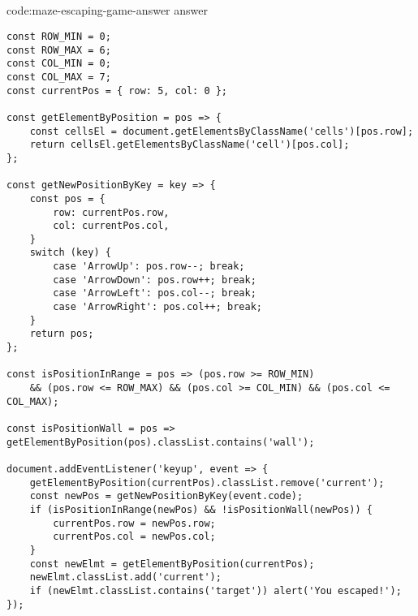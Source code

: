 \subsection*{}

\begin{codeenv}{code:maze-escaping-game-answer}{ answer}
\begin{verbatim}
const ROW_MIN = 0;
const ROW_MAX = 6;
const COL_MIN = 0;
const COL_MAX = 7;
const currentPos = { row: 5, col: 0 };

const getElementByPosition = pos => {
    const cellsEl = document.getElementsByClassName('cells')[pos.row];
    return cellsEl.getElementsByClassName('cell')[pos.col];
};

const getNewPositionByKey = key => {
    const pos = {
        row: currentPos.row,
        col: currentPos.col,
    }
    switch (key) {
        case 'ArrowUp': pos.row--; break;
        case 'ArrowDown': pos.row++; break;
        case 'ArrowLeft': pos.col--; break;
        case 'ArrowRight': pos.col++; break;
    }
    return pos;
};

const isPositionInRange = pos => (pos.row >= ROW_MIN)
    && (pos.row <= ROW_MAX) && (pos.col >= COL_MIN) && (pos.col <= COL_MAX);

const isPositionWall = pos => getElementByPosition(pos).classList.contains('wall');

document.addEventListener('keyup', event => {
    getElementByPosition(currentPos).classList.remove('current');
    const newPos = getNewPositionByKey(event.code);
    if (isPositionInRange(newPos) && !isPositionWall(newPos)) {
        currentPos.row = newPos.row;
        currentPos.col = newPos.col;
    }
    const newElmt = getElementByPosition(currentPos);
    newElmt.classList.add('current');
    if (newElmt.classList.contains('target')) alert('You escaped!');
});
\end{verbatim}
\end{codeenv}
